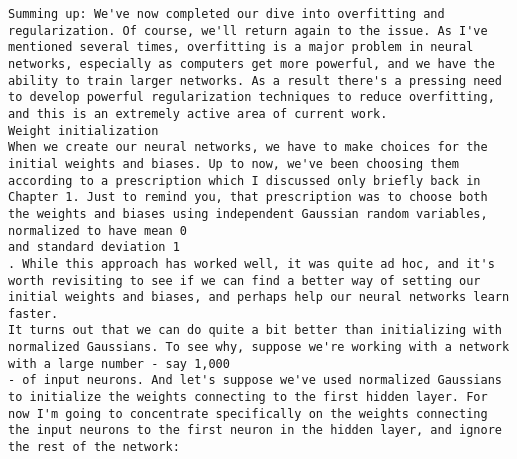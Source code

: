 \begin{lstlisting}
Summing up: We've now completed our dive into overfitting and regularization. Of course, we'll return again to the issue. As I've mentioned several times, overfitting is a major problem in neural networks, especially as computers get more powerful, and we have the ability to train larger networks. As a result there's a pressing need to develop powerful regularization techniques to reduce overfitting, and this is an extremely active area of current work.
Weight initialization
When we create our neural networks, we have to make choices for the initial weights and biases. Up to now, we've been choosing them according to a prescription which I discussed only briefly back in Chapter 1. Just to remind you, that prescription was to choose both the weights and biases using independent Gaussian random variables, normalized to have mean 0
and standard deviation 1
. While this approach has worked well, it was quite ad hoc, and it's worth revisiting to see if we can find a better way of setting our initial weights and biases, and perhaps help our neural networks learn faster.
It turns out that we can do quite a bit better than initializing with normalized Gaussians. To see why, suppose we're working with a network with a large number - say 1,000
- of input neurons. And let's suppose we've used normalized Gaussians to initialize the weights connecting to the first hidden layer. For now I'm going to concentrate specifically on the weights connecting the input neurons to the first neuron in the hidden layer, and ignore the rest of the network:


\end{lstlisting}
